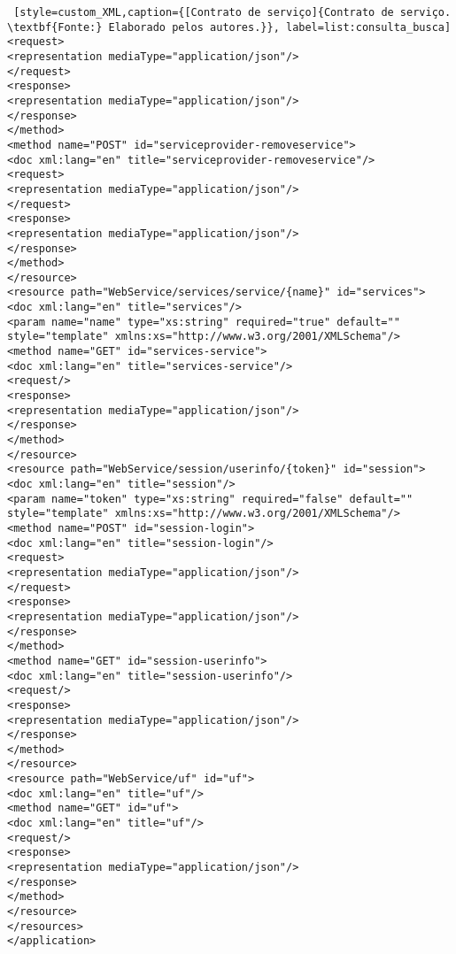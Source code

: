 \begin{lstlisting} [style=custom_XML,caption={[Contrato de serviço]{Contrato de serviço. \textbf{Fonte:} Elaborado pelos autores.}}, label=list:consulta_busca]
<request>
<representation mediaType="application/json"/>
</request>
<response>
<representation mediaType="application/json"/>
</response>
</method>
<method name="POST" id="serviceprovider-removeservice">
<doc xml:lang="en" title="serviceprovider-removeservice"/>
<request>
<representation mediaType="application/json"/>
</request>
<response>
<representation mediaType="application/json"/>
</response>
</method>
</resource>
<resource path="WebService/services/service/{name}" id="services">
<doc xml:lang="en" title="services"/>
<param name="name" type="xs:string" required="true" default="" style="template" xmlns:xs="http://www.w3.org/2001/XMLSchema"/>
<method name="GET" id="services-service">
<doc xml:lang="en" title="services-service"/>
<request/>
<response>
<representation mediaType="application/json"/>
</response>
</method>
</resource>
<resource path="WebService/session/userinfo/{token}" id="session">
<doc xml:lang="en" title="session"/>
<param name="token" type="xs:string" required="false" default="" style="template" xmlns:xs="http://www.w3.org/2001/XMLSchema"/>
<method name="POST" id="session-login">
<doc xml:lang="en" title="session-login"/>
<request>
<representation mediaType="application/json"/>
</request>
<response>
<representation mediaType="application/json"/>
</response>
</method>
<method name="GET" id="session-userinfo">
<doc xml:lang="en" title="session-userinfo"/>
<request/>
<response>
<representation mediaType="application/json"/>
</response>
</method>
</resource>
<resource path="WebService/uf" id="uf">
<doc xml:lang="en" title="uf"/>
<method name="GET" id="uf">
<doc xml:lang="en" title="uf"/>
<request/>
<response>
<representation mediaType="application/json"/>
</response>
</method>
</resource>
</resources>
</application>
\end{lstlisting}
